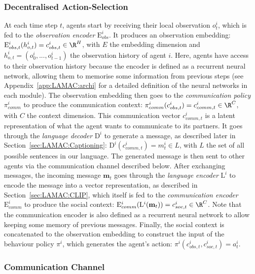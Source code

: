
\subsubsection{Decentralised Action-Selection}

At each time step $t$, agents start by receiving their local observation $o^i_t$, which is fed to the \textit{observation encoder} $\mathrm{E}^i_{obs}$. It produces an observation embedding: $\mathrm{E}^i_{obs,t}(h^i_{o,t})=c^i_{obs,t}\in\R^H$, with $E$ the embedding dimension and $h^i_{o,t}=(o^i_0,...,o^i_{t-1})$ the observation history of agent $i$. Here, agents have access to their observation history because the encoder is defined as a recurrent neural network, allowing them to memorise some information from previous steps (see Appendix~\ref{app:LAMAC:archi} for a detailed definition of the neural networks in each module). The observation embedding then goes to the \textit{communication policy} $\pi_{comm}^i$ to produce the communication context: $\pi_{comm}^i(c^i_{obs,t})=c^i_{comm,t}\in\R^C$, with $C$ the context dimension. This communication vector $c^i_{comm, t}$ is a latent representation of what the agent wants to communicate to its partners. It goes through the \textit{language decoder} $\mathrm{D}^i$ to generate a message, as described later in Section~\ref{sec:LAMAC:Captioning}: $\mathrm{D}^i(c^i_{comm, t})=m^i_t\in L$, with $L$ the set of all possible sentences in our language. The generated message is then sent to other agents via the communication channel described below. After exchanging messages, the incoming message $\mathbf{m}_t$ goes through the \textit{language encoder} $\mathrm{L}^i$ to encode the message into a vector representation, as described in Section~\ref{sec:LAMAC:CLIP}, which itself is fed to the \textit{communication encoder} $\mathrm{E}^i_{comm}$ to produce the social context: $\mathrm{E}^i_{comm}(\mathrm{L}^i(\mathbf{m}_t))=c^i_{soc, t}\in\R^C$. Note that the communication encoder is also defined as a recurrent neural network to allow keeping some memory of previous messages. Finally, the social context is concatenated to the observation embedding to construct the input of the behaviour policy $\pi^i$, which generates the agent's action: $\pi^i(c^i_{obs,t}, c^i_{soc,t})=a^i_t$. 



\subsubsection{Communication Channel}

